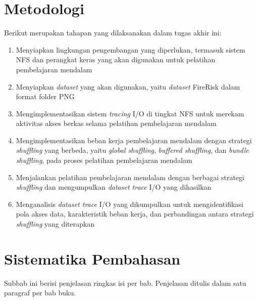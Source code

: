 \section{Metodologi}

Berikut merupakan tahapan yang dilaksanakan dalam tugas akhir ini:

\begin{enumerate}
    \item Menyiapkan lingkungan pengembangan yang diperlukan, termasuk sistem NFS dan perangkat keras yang akan digunakan untuk pelatihan pembelajaran mendalam
    \item Menyiapkan \textit{dataset} yang akan digunakan, yaitu \textit{dataset} FireRisk dalam format folder PNG
    \item Mengimplementasikan sistem \textit{tracing} I/O di tingkat NFS untuk merekam aktivitas akses berkas selama pelatihan pembelajaran mendalam
    \item Mengimplementasikan beban kerja pembelajaran mendalam dengan strategi \textit{shuffling} yang berbeda, yaitu \textit{global shuffling}, \textit{buffered shuffling}, dan \textit{bundle shuffling}, pada proses pelatihan pembelajaran mendalam
    \item Menjalankan pelatihan pembelajaran mendalam dengan berbagai strategi \textit{shuffling} dan mengumpulkan \textit{dataset trace} I/O yang dihasilkan
    \item Menganalisis \textit{dataset trace} I/O yang dikumpulkan untuk mengidentifikasi pola akses data, karakteristik beban kerja, dan perbandingan antara strategi \textit{shuffling} yang diterapkan
\end{enumerate}

\section{Sistematika Pembahasan}
Subbab ini berisi penjelasan ringkas isi per bab. Penjelasan ditulis dalam satu paragraf per bab buku.
